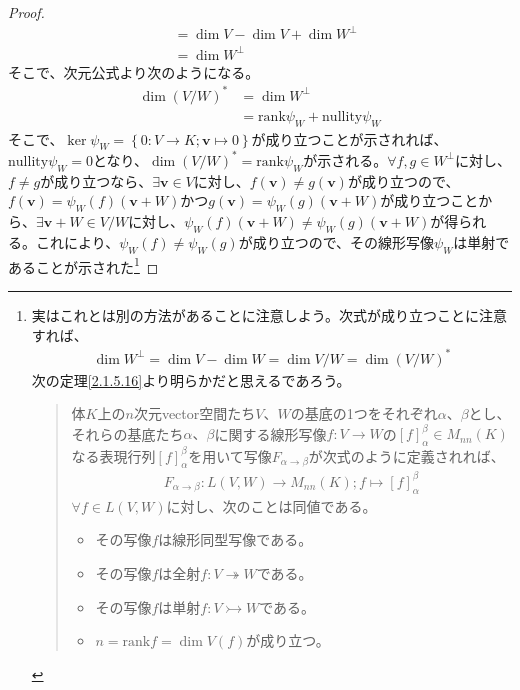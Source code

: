 \documentclass[dvipdfmx]{jsarticle}
\begin{document}
\begin{proof}
\begin{align*}
&= \dim V - \dim V + \dim W^{\bot}\\
&= \dim W^{\bot}
\end{align*}
そこで、次元公式より次のようになる。
\begin{align*}
\dim\left( {V}/{W} \right)^{*} &= \dim W^{\bot}\\
&= \mathrm{rank} \psi_{W} + \mathrm{nullity} \psi_{W}
\end{align*}
そこで、$\ker\psi_{W} = \left\{ 0:V \rightarrow K;\mathbf{v} \mapsto 0 \right\}$が成り立つことが示されれば、$\mathrm{nullity} \psi_{W} = 0$となり、$\dim\left( {V}/{W} \right)^{*} = \mathrm{rank} \psi_{W}$が示される。$\forall f,g \in W^{\bot}$に対し、$f \neq g$が成り立つなら、$\exists\mathbf{v} \in V$に対し、$f\left( \mathbf{v} \right) \neq g\left( \mathbf{v} \right)$が成り立つので、$f\left( \mathbf{v} \right) = \psi_{W}(f)\left( \mathbf{v} + W \right)$かつ$g\left( \mathbf{v} \right) = \psi_{W}(g)\left( \mathbf{v} + W \right)$が成り立つことから、$\exists\mathbf{v} + W \in {V}/{W}$に対し、$\psi_{W}(f)\left( \mathbf{v} + W \right) \neq \psi_{W}(g)\left( \mathbf{v} + W \right)$が得られる。これにより、$\psi_{W}(f) \neq \psi_{W}(g)$が成り立つので、その線形写像$\psi_{W}$は単射であることが示された\footnote{実はこれとは別の方法があることに注意しよう。次式が成り立つことに注意すれば、
  \begin{align*}
\dim W^{\bot} = \dim V - \dim W = \dim{V}/{W} = \dim\left( {V}/{W} \right)^{*}
\end{align*}
  次の定理\ref{2.1.5.16}より明らかだと思えるであろう。
  \begin{quote}
  体$K$上の$n$次元vector空間たち$V$、$W$の基底の1つをそれぞれ$\alpha$、$\beta$とし、それらの基底たち$\alpha 、\beta$に関する線形写像$f:V \rightarrow W$の$[ f]^{\beta}_{\alpha} \in M_{nn}(K)$なる表現行列$[ f]^{\beta}_{\alpha}$を用いて写像$F_{\alpha \rightarrow \beta}$が次式のように定義されれば、
  \begin{align*}
F_{\alpha \rightarrow \beta}:L(V,W) \rightarrow M_{nn}(K);f \mapsto [ f]^{\beta}_{\alpha}
\end{align*}
  $\forall f \in L(V,W)$に対し、次のことは同値である。
  \begin{itemize}
  \item
    その写像$f$は線形同型写像である。
  \item 
    その写像$f$は全射$f:V \twoheadrightarrow W$である。
  \item
    その写像$f$は単射$f:V \rightarrowtail W$である。
  \item
    $n = \mathrm{rank}f = \dim{V(f)}$が成り立つ。

\end{itemize}
\end{quote}}
\end{proof}
\end{document}

